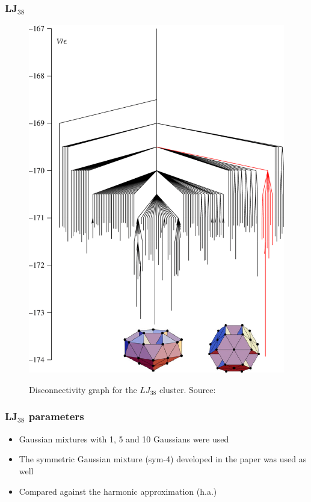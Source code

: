 \documentclass{beamer}
\begin{document}
	\begin{frame}
		\frametitle{LJ$_{38}$} %
		\begin{figure}
			\center
			\includegraphics[height=0.85\textheight]{figures/LJ38.png}
			\label{fig:LJ38_disc}
			\caption{Disconnectivity graph for the $LJ_{38}$ cluster. Source: \cite{Wales2005}}
		\end{figure}
	\end{frame}

	\begin{frame}
		\frametitle{LJ$_{38}$ parameters} 
		\begin{itemize}
			\item Gaussian mixtures with 1, 5 and 10 Gaussians were used
			\item The symmetric Gaussian mixture (sym-4) developed in the paper was used as well
			\item Compared against the harmonic approximation (h.a.)

		\end{itemize}
	\end{frame}
\end{document}
